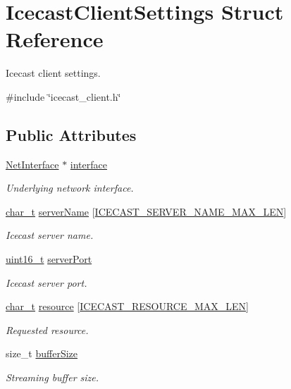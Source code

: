 \hypertarget{structIcecastClientSettings}{}\section{Icecast\+Client\+Settings Struct Reference}
\label{structIcecastClientSettings}


Icecast client settings.  




{\ttfamily \#include \char`\"{}icecast\+\_\+client.\+h\char`\"{}}

\subsection*{Public Attributes}
\begin{DoxyCompactItemize}
\item 
\hyperlink{net_8h_a2234db8911a1148c9159979d8f5e0d6b}{Net\+Interface} $\ast$ \hyperlink{structIcecastClientSettings_a52a70857811f6337d011b835916e9fe2}{interface}
\begin{DoxyCompactList}\small\item\em Underlying network interface. \end{DoxyCompactList}\item 
\hyperlink{compiler__port_8h_a40bb5262bf908c328fbcfbe5d29d0201}{char\+\_\+t} \hyperlink{structIcecastClientSettings_a03d74c882d8ab90fe1f1efd160836b34}{server\+Name} \mbox{[}\hyperlink{icecast__client_8h_a9a553028f9619cec3c7a73ab5900625c}{I\+C\+E\+C\+A\+S\+T\+\_\+\+S\+E\+R\+V\+E\+R\+\_\+\+N\+A\+M\+E\+\_\+\+M\+A\+X\+\_\+\+L\+EN}\mbox{]}
\begin{DoxyCompactList}\small\item\em Icecast server name. \end{DoxyCompactList}\item 
\hyperlink{stdint_8h_a273cf69d639a59973b6019625df33e30}{uint16\+\_\+t} \hyperlink{structIcecastClientSettings_a882d219c88d29905c69a4cde1796a913}{server\+Port}
\begin{DoxyCompactList}\small\item\em Icecast server port. \end{DoxyCompactList}\item 
\hyperlink{compiler__port_8h_a40bb5262bf908c328fbcfbe5d29d0201}{char\+\_\+t} \hyperlink{structIcecastClientSettings_a81f6aaa6b4b3aacb4a267b058afa632e}{resource} \mbox{[}\hyperlink{icecast__client_8h_ad4b3bc69341a6ccaa4b498ad73415d1f}{I\+C\+E\+C\+A\+S\+T\+\_\+\+R\+E\+S\+O\+U\+R\+C\+E\+\_\+\+M\+A\+X\+\_\+\+L\+EN}\mbox{]}
\begin{DoxyCompactList}\small\item\em Requested resource. \end{DoxyCompactList}\item 
size\+\_\+t \hyperlink{structIcecastClientSettings_a6957adef33fd7059c925a5f89cb676fc}{buffer\+Size}
\begin{DoxyCompactList}\small\item\em Streaming buffer size. \end{DoxyCompactList}\end{DoxyCompactItemize}


